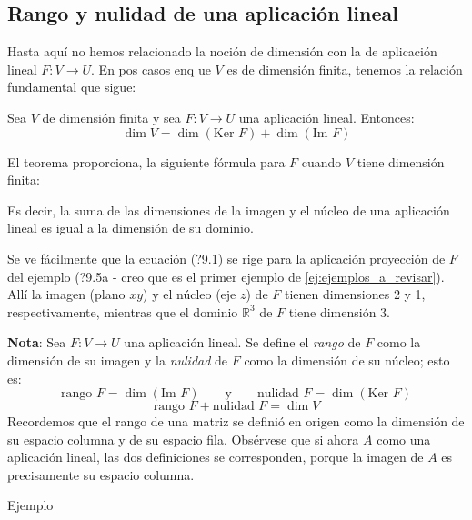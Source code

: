 \subsection{Rango y nulidad de una aplicación lineal}

Hasta aquí no hemos relacionado la noción de dimensión con la de aplicación lineal \(F : V \rightarrow U\). En pos casos enq ue \(V\) es de dimensión finita, tenemos la relación fundamental que sigue:

\teorema
Sea \(V\) de dimensión finita y sea \(F:V\rightarrow U\) una aplicación lineal. Entonces:
\begin{equation}
  \dim V = \dim( \text{Ker } F) + \dim(\text{Im } F)
  \label{eq:teorema_dimensión_nucleo_imagen}  
\end{equation}

El teorema proporciona, la siguiente fórmula para \(F\) cuando \(V\) tiene dimensión finita:

Es decir, la suma de las dimensiones de la imagen y el núcleo de una aplicación lineal es igual a la dimensión de su dominio. 

Se ve fácilmente que la ecuación (?9.1) se rige para la aplicación proyección de \(F\) del ejemplo (?9.5a - creo que es el primer ejemplo de \ref{ej:ejemplos_a_revisar}). Allí la imagen (plano \(xy\)) y el núcleo (eje \(z\)) de \(F\) tienen dimensiones 2 y 1, respectivamente, mientras que el dominio \(\mathbb{R}^3\) de \(F\) tiene dimensión 3.

\textbf{Nota}: Sea \(F:V\rightarrow U\) una aplicación lineal. Se define el \textit{rango} de \(F\) como la dimensión de su imagen y la \textit{nulidad} de \(F\) como la dimensión de su núcleo; esto es:
\[
  \text{rango } F = \dim(\text{Im } F) \qquad \text{y} \qquad \text{nulidad } F = \dim(\text{Ker } F)
\]
\[
\text{rango } F + \text{nulidad } F = \dim V
\]
Recordemos que el rango de una matriz se definió en origen como la dimensión de su espacio columna y de su espacio fila. Obsérvese que si ahora \(A\) como una aplicación lineal, las dos definiciones se corresponden, porque la imagen de \(A\) es precisamente su espacio columna.

Ejemplo

